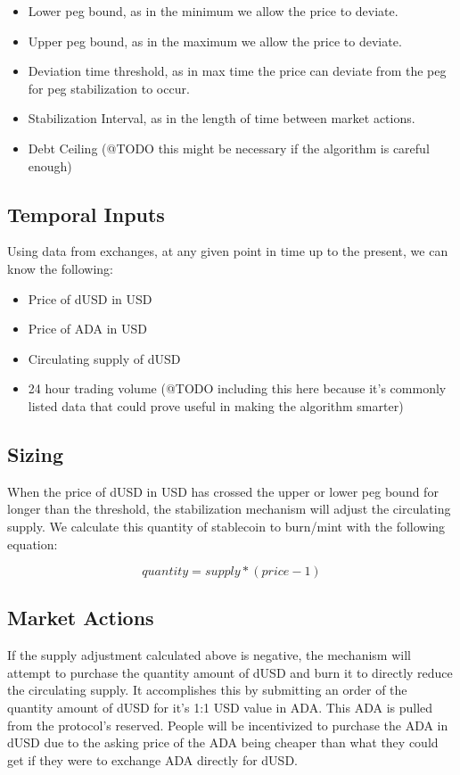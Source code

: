 \documentclass[12pt]{article}
\begin{document}
\begin{itemize}
  \item Lower peg bound, as in the minimum we allow the price to deviate.
  \item Upper peg bound, as in the maximum we allow the price to deviate.
  \item Deviation time threshold, as in max time the price can deviate from the peg for peg stabilization to occur. 
  \item Stabilization Interval, as in the length of time between market actions.
  \item Debt Ceiling (@TODO this might be necessary if the algorithm is careful enough)
\end{itemize}


\subsection{Temporal Inputs}

Using data from exchanges, at any given point in time up to the present, we can know the following:
\begin{itemize}
  \item Price of dUSD in USD
  \item Price of ADA in USD
  \item Circulating supply of dUSD
  \item 24 hour trading volume (@TODO including this here because it's commonly listed data that could prove useful in making the algorithm smarter)
\end{itemize}

\subsection{Sizing}

When the price of dUSD in USD has crossed the upper or lower peg bound for longer than the threshold, the stabilization mechanism will adjust the circulating supply. We calculate this quantity of stablecoin to burn/mint with the following equation:

\begin{equation*}
    quantity = supply * (price - 1)
\end{equation*}

\subsection{Market Actions}

If the supply adjustment calculated above is negative, the mechanism will attempt to purchase the quantity amount of dUSD and burn it to directly reduce the circulating supply. It accomplishes this by submitting an order of the quantity amount of dUSD for it's 1:1 USD value in ADA. This ADA is pulled from the protocol's reserved. People will be incentivized to purchase the ADA in dUSD due to the asking price of the ADA being cheaper than what they could get if they were to exchange ADA directly for dUSD.
\end{document}

